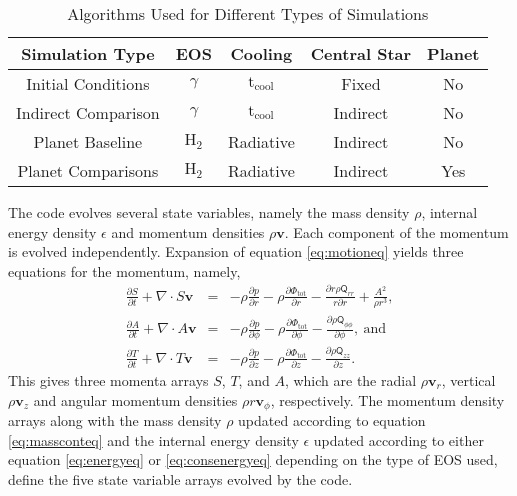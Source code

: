 \begin{table}
\centering
 \begin{tabular}{ccccc}
  \hline
Simulation Type&EOS&Cooling&Central Star&Planet\\
  \hline\hline  
  Initial Conditions&$\gamma$&$\mathrm{t_{cool}}$&Fixed&No\\
  Indirect Comparison&$\gamma$&$\mathrm{t_{cool}}$&Indirect&No\\
  Planet Baseline&$\mathrm{H_2}$&Radiative&Indirect&No\\
  Planet Comparisons&$\mathrm{H_2}$&Radiative&Indirect&Yes\\   
 \hline
\end{tabular}
\caption[Algorithms Used]{Algorithms Used for Different Types of Simulations}
\label{tbl:algtable}
\end{table}

The code evolves several state variables, namely the mass density $\rho$, internal energy density $\epsilon$ and momentum densities $\rho \boldsymbol{v}$. Each component of the momentum is evolved independently. Expansion of equation \eqref{eq:motioneq} yields three equations for the momentum, namely,
\begin{eqnarray}
\frac{\partial S}{\partial t} + \nabla \cdot S \boldsymbol{v} &=& -\rho \frac{\partial p}{\partial r} -\rho \frac{\partial \Phi_{\mathrm{tot}}}{\partial r} - \frac{\partial r \rho \mathsf{Q}_{rr}}{r \partial r} + \frac{A^2}{\rho r^3},\\
\frac{\partial A}{\partial t}+ \nabla \cdot A \boldsymbol{v} &=& -\rho\frac{\partial p}{\partial \phi} - \rho\frac{\partial \Phi_{\mathrm{tot}}}{\partial \phi}- \frac{\partial \rho \mathsf{Q}_{\phi \phi}}{\partial \phi},~\mathrm{and}\\
\frac{\partial T}{\partial t} + \nabla \cdot T \boldsymbol{v} &=& -\rho \frac{\partial p}{\partial z} -\rho\frac{\partial \Phi_{\mathrm{tot}}}{\partial z} - \frac{\partial \rho \mathsf{Q}_{zz}}{\partial z}.
\end{eqnarray}
This gives three momenta arrays $S$, $T$, and $A$, which are the radial $\rho \boldsymbol{v}_r$, vertical $\rho \boldsymbol{v}_z$ and angular momentum densities $\rho r \boldsymbol{v}_\phi$, respectively. The momentum density arrays along with the mass density $\rho$ updated according to equation \eqref{eq:massconteq} and the internal energy density $\epsilon$ updated according to either equation \eqref{eq:energyeq} or \eqref{eq:consenergyeq} depending on the type of EOS used, define the five state variable arrays evolved by the code. 

